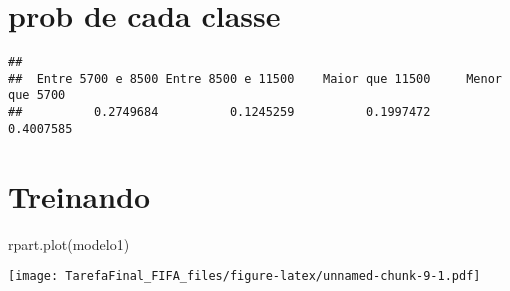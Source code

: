 \documentclass[
]{article}
\newenvironment{Shaded}{\begin{snugshade}}{\end{snugshade}}
\newcommand{\AttributeTok}[1]{\textcolor[rgb]{0.77,0.63,0.00}{#1}}
\newcommand{\DecValTok}[1]{\textcolor[rgb]{0.00,0.00,0.81}{#1}}
\newcommand{\FloatTok}[1]{\textcolor[rgb]{0.00,0.00,0.81}{#1}}
\newcommand{\FunctionTok}[1]{\textcolor[rgb]{0.00,0.00,0.00}{#1}}
\newcommand{\NormalTok}[1]{#1}
\newcommand{\OtherTok}[1]{\textcolor[rgb]{0.56,0.35,0.01}{#1}}
\newcommand{\SpecialCharTok}[1]{\textcolor[rgb]{0.00,0.00,0.00}{#1}}
\newcommand{\StringTok}[1]{\textcolor[rgb]{0.31,0.60,0.02}{#1}}
\begin{document}
\hypertarget{prob-de-cada-classe}{%
\section{prob de cada classe}\label{prob-de-cada-classe}}

\begin{Shaded}
\end{Shaded}

\begin{verbatim}
## 
##  Entre 5700 e 8500 Entre 8500 e 11500    Maior que 11500     Menor que 5700 
##          0.2749684          0.1245259          0.1997472          0.4007585
\end{verbatim}

\hypertarget{treinando}{%
\section{Treinando}\label{treinando}}

\begin{Shaded}
\end{Shaded}

\begin{Shaded}
\begin{Highlighting}[]
\FunctionTok{rpart.plot}\NormalTok{(modelo1)}
\end{Highlighting}
\end{Shaded}

\texttt{[image: TarefaFinal\_FIFA\_files/figure-latex/unnamed-chunk-9-1.pdf]}
\end{document}
